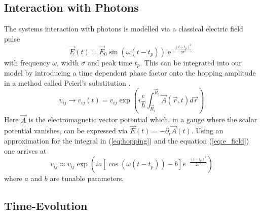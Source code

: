 \subsection{Interaction with Photons}
The systems interaction with photons is modelled via a classical electric field pulse
\begin{equation}
    \Vec{E}(t) = \Vec{E}_0 \sin(\omega(t-t_p))\operatorname{e}^{-\frac{(t-t_p)^2}{2\sigma^2}} \label{eq:e_field}
\end{equation}
with frequency $\omega$, width $\sigma$ and peak time $t_p$. This can be integrated into our model by introducing a time dependent phase factor onto the hopping amplitude in a method called Peierl's substitution \cite{peierl}.
\begin{equation}
    v_{ij} \to v_{ij}(t) = v_{ij}\exp\left(i\frac{e}{\hbar} \int_{\Vec{R}_i}^{\Vec{R}_j} \Vec{A}(\Vec{r},t) d\Vec{r}\right)\label{eq:hopping}
\end{equation}
Here $\Vec{A}$ is the electromagnetic vector potential which, in a gauge where the scalar potential vanishes, can be expressed via $\Vec{E}(t) = -\partial_t \Vec{A}(t)$. Using an approximation for the integral in (\ref{eq:hopping}) and the equation (\ref{eq:e_field}) one arrives at
\begin{equation}
    v_{ij} \approx v_{ij} \exp\left(ia[\cos(\omega (t-t_p))-b] e^{-\frac{(t-t_p)^2}{2\sigma^2}}\right)
\end{equation}
where $a$ and $b$ are tunable parameters.


\subsection{Time-Evolution}

